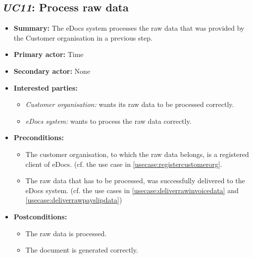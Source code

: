 \documentclass[a4paper,10pt]{article}
\begin{document}
\subsection{\emph{UC11}: Process raw data}
\label{usecase:processrawdata}
\begin{itemize}
    \item \textbf{Summary:} The eDocs system processes the raw data that was provided by the Customer organisation in a previous step.
    \item \textbf{Primary actor:} Time
    \item \textbf{Secondary actor:} None
    \item \textbf{Interested parties:} 
        \begin{itemize}
            \item \textit{Customer organisation:} wants its raw data to be processed correctly.
            \item \textit{eDocs system:} wants to process the raw data correctly.
        \end{itemize}
    \item \textbf{Preconditions:}
        \begin{itemize}
            \item The customer organisation, to which the raw data belongs, is a registered client of eDocs. (cf. the use case in \ref{usecase:registercustomerorg}.
            \item The raw data that has to be processed, was successfully delivered to the eDocs system. (cf. the use cases in \ref{usecase:deliverrawinvoicedata} and \ref{usecase:deliverrawpayslipdata})
        \end{itemize}
    \item \textbf{Postconditions:}
        \begin{itemize}
            \item The raw data is processed.
            \item The document is generated correctly.
        \end{itemize}
        

\end{itemize}
\end{document}
